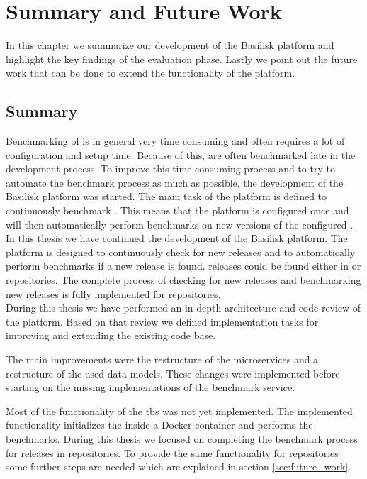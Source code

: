 \chapter{Summary and Future Work}
\label{ch:summary}

In this chapter we summarize our development of the Basilisk platform and highlight the key findings of the evaluation phase.
Lastly we point out the future work that can be done to extend the functionality of the platform.

\section{Summary}
Benchmarking of \tsp{} is in general very time consuming and often requires a lot of configuration and setup time.
Because of this, \tsp{} are often benchmarked late in the development process.
To improve this time consuming process and to try to automate the benchmark process as much as possible, the development of the Basilisk platform was started.
The main task of the platform is defined to continuously benchmark \tsp{}.
This means that the platform is configured once and will then automatically perform benchmarks on new versions of the configured \tsp{}.
\\

In this thesis we have continued the development of the Basilisk platform.
The platform is designed to continuously check for new \ts{} releases and to automatically perform benchmarks if a new release is found.
\ts{} releases could be found either in \dockh{} or \gh{} repositories.
The complete process of checking for new releases and benchmarking new releases is fully implemented for \dockh{} repositories.
\\

During this thesis we have performed an in-depth architecture and code review of the platform.
Based on that review we defined implementation tasks for improving and extending the existing code base.

The main improvements were the restructure of the microservices and a restructure of the used data models.
These changes were implemented before starting on the missing implementations of the benchmark service.

Most of the functionality of the \acl{tbs} was not yet implemented.
The implemented functionality initializes the \ts{} inside a Docker container and performs the benchmarks.
During this thesis we focused on completing the benchmark process for \ts{} releases in \dockh{} repositories.
To provide the same functionality for \gh{} repositories some further steps are needed which are explained in section \ref{sec:future_work}.

